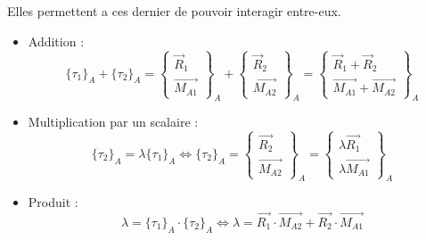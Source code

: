 Elles permettent a ces dernier de pouvoir interagir entre-eux.
\begin{prop}
\begin{itemize}
    \item Addition :
    $$\{\tau_1\}_A+\{\tau_2\}_A=\begin{Bmatrix}\overrightarrow{R}_1\\\overrightarrow{M_{A1}}\end{Bmatrix}_A+\begin{Bmatrix}\overrightarrow{R}_2\\\overrightarrow{M_{A2}}\end{Bmatrix}_A=\begin{Bmatrix}\overrightarrow{R}_1+\overrightarrow{R}_2\\\overrightarrow{M_{A1}}+\overrightarrow{M_{A2}}\end{Bmatrix}_A$$
    \item Multiplication par un scalaire :
    $$\{\tau_2\}_A=\lambda\{\tau_1\}_A \Leftrightarrow \{\tau_2\}_A=\begin{Bmatrix}\overrightarrow{R_2}\\\overrightarrow{M_{A2}}\end{Bmatrix}_A=\begin{Bmatrix}\lambda\overrightarrow{R_1}\\\lambda\overrightarrow{M_{A1}}\end{Bmatrix}_A$$
    \item Produit :
    $$\lambda=\{\tau_1\}_A\cdot\{\tau_2\}_A \Leftrightarrow\lambda=\overrightarrow{R_1}\cdot\overrightarrow{M_{A2}}+\overrightarrow{R_2}\cdot\overrightarrow{M_{A1}}$$
\end{itemize}
\end{prop}
